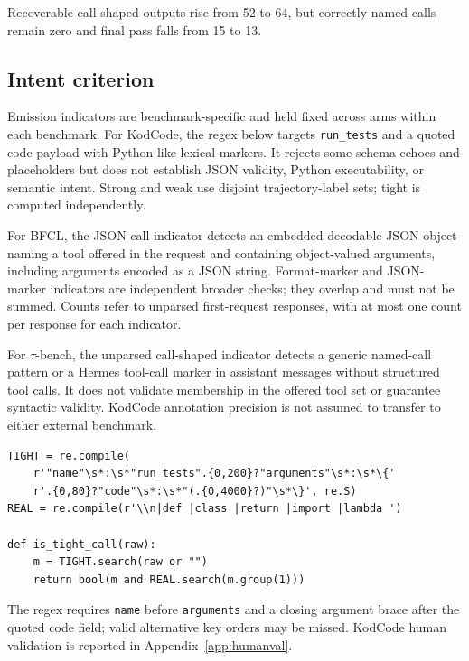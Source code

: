 Recoverable call-shaped outputs rise from 52 to 64, but correctly named calls remain zero and
final pass falls from 15 to 13.

\subsection{Intent criterion}

Emission indicators are benchmark-specific and held fixed across arms within each benchmark.
For KodCode, the regex below targets \texttt{run\_tests} and a quoted code payload with
Python-like lexical markers. It rejects some schema echoes and placeholders but does not
establish JSON validity, Python executability, or semantic intent. Strong and weak use
disjoint trajectory-label sets; tight is computed independently.

For BFCL, the JSON-call indicator detects an embedded decodable JSON object naming a tool
offered in the request and containing object-valued arguments, including arguments encoded
as a JSON string. Format-marker and JSON-marker indicators are independent broader checks;
they overlap and must not be summed. Counts refer to unparsed first-request responses,
with at most one count per response for each indicator.

For $\tau$-bench, the unparsed call-shaped indicator detects a generic named-call pattern
or a Hermes tool-call marker in assistant messages without structured tool calls. It does
not validate membership in the offered tool set or guarantee syntactic validity.
KodCode annotation precision is not assumed to transfer to either external benchmark.


\begin{Verbatim}[fontsize=\small,breaklines=true,breakanywhere=true]
TIGHT = re.compile(
    r'"name"\s*:\s*"run_tests".{0,200}?"arguments"\s*:\s*\{'
    r'.{0,80}?"code"\s*:\s*"(.{0,4000}?)"\s*\}', re.S)
REAL = re.compile(r'\\n|def |class |return |import |lambda ')

def is_tight_call(raw):
    m = TIGHT.search(raw or "")
    return bool(m and REAL.search(m.group(1)))
\end{Verbatim}

The regex requires \texttt{name} before \texttt{arguments} and a closing argument brace
after the quoted code field; valid alternative key orders may be missed.
KodCode human validation is reported in Appendix~\ref{app:humanval}.
